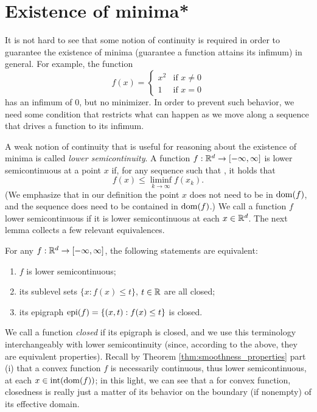 \section{Existence of minima*}
\label{sec:existence_minima}

It is not hard to see that some notion of continuity is required in order to
guarantee the existence of minima (guarantee a function attains its infimum) in
general. For example, the function
\begin{equation}
\label{eq:discontinuous_quadratic}
f(x) = \begin{cases}
x^2 & \text{if $x \not= 0$} \\
1 & \text{if $x = 0$}
\end{cases}
\end{equation}
has an infimum of 0, but no minimizer. In order to prevent such behavior, we
need some condition that restricts what can happen as we move along a sequence
that drives a function to its infimum.  

A weak notion of continuity that is useful for reasoning about the existence  
of minima is called \emph{lower semicontinuity}. A function $f : \mathbb{R}^d \to 
[-\infty, \infty]$ is lower semicontinuous at a point $x$ if, for any sequence 
such that , it holds that 
\[
f(x) \leq \liminf_{k \to \infty} f(x_k). 
\]
(We emphasize that in our definition the point $x$ does not need to be in
$\operatorname{dom}(f)$, and the sequence  does need to be
contained in $\operatorname{dom}(f)$.)  We call a function $f$ lower semicontinuous if it
is lower semicontinuous at each $x \in \mathbb{R}^d$. The next lemma collects a few 
relevant equivalences.

\begin{Lemma}
\label{lem:lower_semicontinuous}
For any $f : \mathbb{R}^d \to [-\infty, \infty]$, the following statements are equivalent:
\begin{enumerate}[label=(\roman*)]
\item $f$ is lower semicontinuous;
\item its sublevel sets $\{x : f(x) \leq t\}$, $t \in \mathbb{R}$ are all closed;
\item its epigraph $\operatorname{epi}(f) = \{(x,t) : f(x) \leq t\}$ is closed. 
\end{enumerate}
\end{Lemma}

We call a function \emph{closed} if its epigraph is closed, and we use this
terminology interchangeably with lower semicontinuity (since, according to the
above, they are equivalent properties). Recall by Theorem
\ref{thm:smoothness_properties} part (i) that a convex function $f$ is
necessarily continuous, thus lower semicontinuous, at each $x \in
\operatorname{int}(\operatorname{dom}(f))$; in this light, we can see that a for convex function,
closedness is really just a matter of its behavior on the boundary (if nonempty)
of its effective domain.


